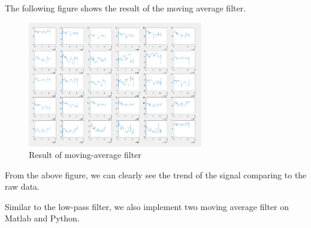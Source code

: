 \documentclass[conference]{IEEEtran}
\begin{document}
The following figure shows the result of the moving average filter.
\begin{figure}[H]
\centering
\includegraphics[width=3in]{MAF.png}
\caption{Result of moving-average filter}
\end{figure}
From the above figure, we can clearly see the trend of the signal comparing to the raw data.

Similar to the low-pass filter, we also implement two moving average filter on Matlab and Python.
\end{document}
